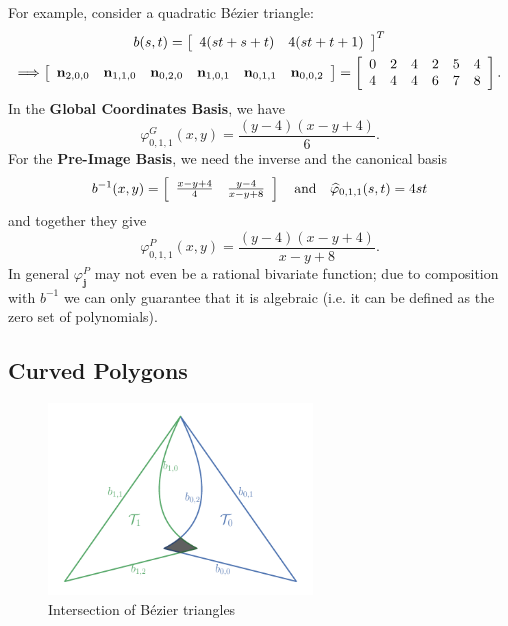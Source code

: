 \noindent For example, consider a quadratic B\'{e}zier triangle:
\begin{gather}
b(s, t) = \left[ \begin{array}{c c}
    4 (s t + s + t) & 4 (s t + t + 1)
  \end{array}\right]^T \\
\Longrightarrow
\left[ \begin{array}{c c c c c c}
    \mathbf{n}_{2, 0, 0} &
    \mathbf{n}_{1, 1, 0} &
    \mathbf{n}_{0, 2, 0} &
    \mathbf{n}_{1, 0, 1} &
    \mathbf{n}_{0, 1, 1} &
    \mathbf{n}_{0, 0, 2}
  \end{array}\right] = \left[ \begin{array}{c c c c c c}
    0 & 2 & 4 & 2 & 5 & 4 \\
    4 & 4 & 4 & 6 & 7 & 8
  \end{array}\right].
\end{gather}
In the \textbf{Global Coordinates Basis}, we have
\begin{equation}
\varphi^{G}_{0, 1, 1}(x, y) = \frac{(y - 4) (x - y + 4)}{6}.
\end{equation}
For the \textbf{Pre-Image Basis}, we need the inverse
and the canonical basis
\begin{equation}
b^{-1}(x, y) = \left[ \begin{array}{c c}
    \frac{x - y + 4}{4} & \frac{y - 4}{x - y + 8}
  \end{array}\right] \quad \text{and} \quad
\widehat{\varphi}_{0, 1, 1}(s, t) = 4 s t
\end{equation}
and together they give
\begin{equation}
\varphi^{P}_{0, 1, 1}(x, y) = \frac{(y - 4) (x - y + 4)}{x - y + 8}.
\end{equation}
In general \(\varphi_{\mathbf{j}}^P\) may not even be a rational bivariate
function; due to composition with \(b^{-1}\) we can only guarantee that
it is algebraic (i.e. it can be defined as the zero set of polynomials).

\subsection{Curved Polygons}

\begin{figure}
  \includegraphics[width=0.625\textwidth]{../images/curved-mesh/main_figure26.pdf}
  \centering
  \caption{Intersection of B\'{e}zier triangles}
  \label{fig:bezier-triangle-intersect}
\end{figure}

